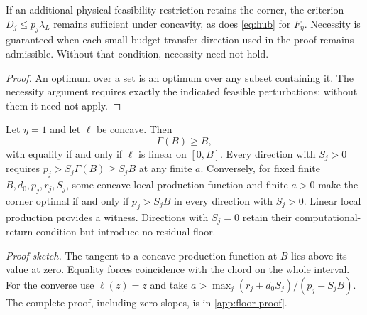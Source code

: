 \begin{corollary}
\label{cor:feasibility}
If an additional physical feasibility restriction retains the corner,
the criterion $D_j\leq p_j\lambda_L$ remains sufficient under
concavity, as does \cref{eq:hub} for $F_\eta$. Necessity is guaranteed
when each small budget-transfer direction used in the proof remains
admissible. Without that condition, necessity need not hold.
\end{corollary}
\begin{proof}
An optimum over a set is an optimum over any subset containing it.
The necessity argument requires exactly the indicated feasible
perturbations; without them it need not apply.
\end{proof}

\begin{productioncorollary}
\label{cor:production-growth}
Let $\eta=1$ and let $\ell$ be concave. Then
\begin{equation}
 \Gamma(B)\geq B,
 \label{eq:tight-floor}
\end{equation}
with equality if and only if $\ell$ is linear on $[0,B]$.
Every direction with $S_j>0$ requires
$p_j>S_j\Gamma(B)\geq S_jB$ at any finite $a$.
Conversely, for fixed finite $B,d_0,p_j,r_j,S_j$, some concave local
production function and finite $a>0$ make the corner optimal if and
only if $p_j>S_jB$ in every direction with $S_j>0$.
Linear local production provides a witness. Directions with $S_j=0$
retain their computational-return condition but introduce no residual
floor.
\end{productioncorollary}
\noindent\emph{Proof sketch.}
The tangent to a concave production function at $B$ lies above its
value at zero. Equality forces coincidence with the chord on the whole
interval. For the converse use $\ell(z)=z$ and take
$a>\max_j(r_j+d_0S_j)/(p_j-S_jB)$.
The complete proof, including zero slopes, is in \cref{app:floor-proof}.

